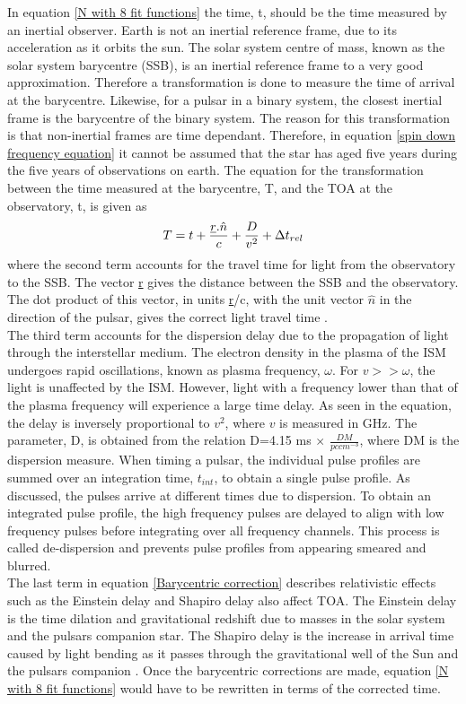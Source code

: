 \documentclass[12pt]{article}
\begin{document}
	\noindent In equation \ref{N with 8 fit functions} the time, t, should be the time measured by an inertial observer. Earth is not an inertial reference frame, due to its acceleration as it orbits the sun. The solar system centre of mass, known as the solar system barycentre (SSB), is an inertial reference frame to a very good approximation. Therefore a transformation is done to measure the time of arrival at the barycentre. Likewise, for a pulsar in a binary system, the closest inertial frame is the barycentre of the binary system. The reason for this transformation is that non-inertial frames are time dependant. Therefore, in equation \ref{spin down frequency equation} it cannot be assumed that the star has aged five years during the five years of observations on earth. The equation for the transformation between the time measured at the barycentre, T, and the TOA at the observatory, t, is given as
	\begin{equation}\label{Barycentric correction}
	T=t+\frac{\uline{r}.\hat{n}}{c}+\frac{D}{v^2}+\Delta t_{rel}
	\end{equation}
	where the second term accounts for the travel time for light from the observatory to the SSB. The vector \uline{r} gives the distance between the SSB and the observatory. The dot product of this vector, in units \uline{r}/c, with the unit vector $\hat{n}$ in the direction of the pulsar, gives the correct light travel time \cite{backer1986pulsar}.\\ 
	
	\noindent The third term accounts for the dispersion delay due to the propagation of light through the interstellar medium. The electron density in the plasma of the ISM undergoes rapid oscillations, known as plasma frequency, $\omega$. For $v>>\omega$, the light is unaffected by the ISM. However, light with a frequency lower than that of the plasma frequency will experience a large time delay. As seen in the equation, the delay is inversely proportional to $v^2$, where $v$ is measured in GHz. The parameter, D, is obtained from the relation D=4.15 ms $\times$ $\frac{DM}{pc cm^{-3}}$, where DM is the dispersion measure. When timing a pulsar, the individual pulse profiles are summed over an integration time, $t_{int}$, to obtain a single pulse profile. As discussed, the pulses arrive at different times due to dispersion. To obtain an integrated pulse profile, the high frequency pulses are delayed to align with low frequency pulses before integrating over all frequency channels. This process is called de-dispersion and prevents pulse profiles from appearing smeared and blurred.\\
	The last term in equation \ref{Barycentric correction} describes relativistic effects such as the Einstein delay and Shapiro delay also affect TOA. The Einstein delay is the time dilation and gravitational redshift due to masses in the solar system and the pulsars companion star. The Shapiro delay is the increase in arrival time caused by light bending as it passes through the gravitational well of the Sun and the pulsars companion \cite{stairs2003testing}. Once the barycentric corrections are made, equation \ref{N with 8 fit functions} would have to be rewritten in terms of the corrected time.\\  
	
\end{document}

